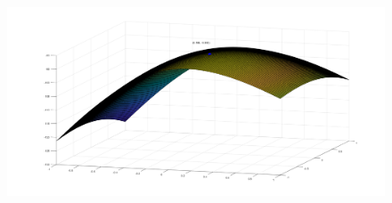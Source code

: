 \begin{enumerate}[label= (\alph*)]
    \begin{center}
        \begin{figure}[H]
            \centering
            \includegraphics[scale=0.3]{./matlab/chapter-4/sol4.40.d.surf.png}
        \end{figure}
    \end{center}
    
\end{enumerate}